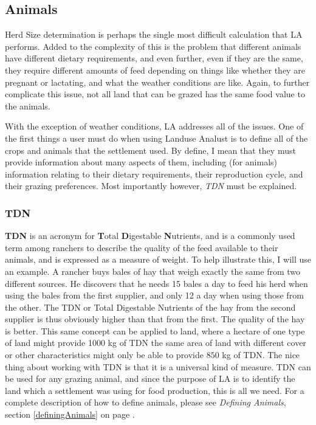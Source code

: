   \subsection{Animals}
  Herd Size determination is perhaps the single most difficult calculation that LA
performs.  Added to the complexity of this is the problem that different animals have different dietary requirements, and even further, even if they are the same, they require different amounts of feed depending on things like whether they are pregnant or lactating, and what the weather conditions are like.  Again, to further complicate this issue, not all land that can be grazed has the same food value to the animals.

  With the exception of weather conditions, LA addresses all of the issues.  One of the first things a user must do when using
Landuse Analust is to define all of the crops and animals that the settlement used.  By define, I mean that they must provide information about many aspects of them, including (for animals) information relating to their dietary requirements, their reproduction cycle, and their grazing preferences.  Most importantly however, \textit{TDN} must be explained.

    \subsubsection{TDN}
      \label{TDN}
    \textbf{TDN} is an acronym for \textbf{T}otal \textbf{D}igestable \textbf{N}utrients, and is a commonly used term among ranchers to describe the quality of the feed available to their animals, and is expressed as a measure of weight.  To help illustrate this, I will use an example.  A rancher buys bales of hay that weigh exactly the same from two different sources.  He discovers that he needs 15 bales a day to feed his herd when using the bales from the first supplier, and only 12 a day when using those from the other.  The TDN or Total Digestable Nutrients of the hay from the second supplier is thus obviously higher than that from the first.  The quality of the hay is better.  This same concept can be applied to land, where a hectare of one type of land might provide 1000 kg of TDN the same area of land with different cover or other characteristics might only be able to provide $850$ kg of TDN.  The nice thing about working with TDN is that it is a universal kind of measure.  TDN can be used for any grazing animal, and since the purpose of LA is to identify the land which a settlement was using for food production, this is all we need.  For a complete description of how to define animals, please see  \textit{Defining Animals}, section \ref{definingAnimals} on page \pageref{definingAnimals}.

